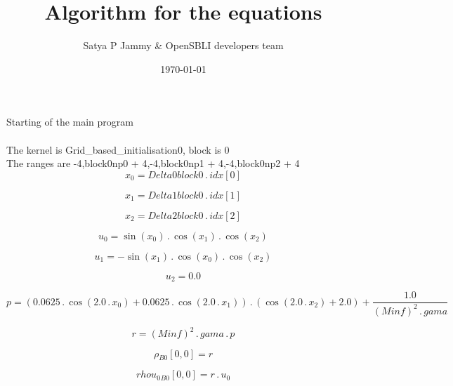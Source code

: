 \documentclass{article}
\title{Algorithm for the equations}
\author{Satya P Jammy \& OpenSBLI developers team}
\date{\today}
\begin{document}
\maketitle
\noindent Starting of the main program\\
\\\noindent The kernel is Grid_based_initialisation0, block is 0\\\noindent The ranges are -4,block0np0 + 4,-4,block0np1 + 4,-4,block0np2 + 4\\\begin{dmath}x_{0} = Delta0block0 \,.\, {idx}[{0}]\end{dmath}

\begin{dmath}x_{1} = Delta1block0 \,.\, {idx}[{1}]\end{dmath}

\begin{dmath}x_{2} = Delta2block0 \,.\, {idx}[{2}]\end{dmath}

\begin{dmath}u_{0} = \sin{\left (x_{0} \right )} \,.\, \cos{\left (x_{1} \right )} \,.\, \cos{\left (x_{2} \right )}\end{dmath}

\begin{dmath}u_{1} = - \sin{\left (x_{1} \right )} \,.\, \cos{\left (x_{0} \right )} \,.\, \cos{\left (x_{2} \right )}\end{dmath}

\begin{dmath}u_{2} = 0.0\end{dmath}

\begin{dmath}p = \left(0.0625 \,.\, \cos{\left (2.0 \,.\, x_{0} \right )} + 0.0625 \,.\, \cos{\left (2.0 \,.\, x_{1} \right )}\right) \,.\, \left(\cos{\left (2.0 \,.\, x_{2} \right )} + 2.0\right) + \frac{1.0}{\left(Minf \right)^{2} \,.\, 
gama}\end{dmath}

\begin{dmath}r = \left(Minf \right)^{2} \,.\, gama \,.\, p\end{dmath}

\begin{dmath}{\rho{_{B0}}}[{0,0}] = r\end{dmath}

\begin{dmath}{rhou_{0}{_{B0}}}[{0,0}] = r \,.\, u_{0}\end{dmath}
\end{document}
